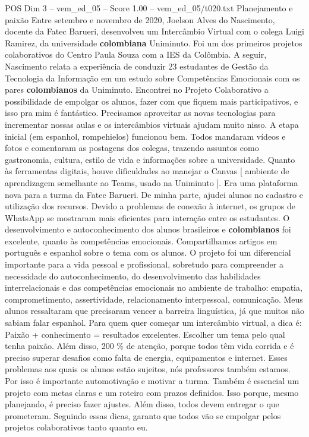 \begin{textsample}{POS Dim 3 – vem\_ed\_05 – Score 1.00 – vem\_ed\_05/t020.txt}  \label{ex:f3_pos_123}
Planejamento e paixão Entre setembro e novembro de 2020, Joelson Alves do Nascimento, docente da Fatec Barueri, desenvolveu um Intercâmbio Virtual com o colega Luigi Ramirez, da universidade \textbf{colombiana} Uniminuto.
Foi um dos primeiros projetos colaborativos do Centro Paula Souza com a IES da Colômbia.
A seguir, Nascimento relata a experiência de conduzir 23 estudantes de Gestão da Tecnologia da Informação em um estudo sobre Competências Emocionais com os pares \textbf{colombianos} da Uniminuto.
Encontrei no Projeto Colaborativo a possibilidade de empolgar os alunos, fazer com que fiquem mais participativos, e isso pra mim é fantástico.
Precisamos aproveitar as novas tecnologias para incrementar nossas aulas e os intercâmbios virtuais ajudam muito nisso.
A etapa inicial (em espanhol, rompehielos) funcionou bem.
Todos mandaram vídeos e fotos e comentaram as postagens dos colegas, trazendo assuntos como gastronomia, cultura, estilo de vida e informações sobre a universidade.
Quanto às ferramentas digitais, houve dificuldades ao manejar o Canvas [ ambiente de aprendizagem semelhante ao Teams, usado na Uniminuto ].
Era uma plataforma nova para a turma da Fatec Barueri.
De minha parte, ajudei alunos no cadastro e utilização dos recursos.
Devido a problemas de conexão à internet, os grupos de WhatsApp se mostraram mais eficientes para interação entre os estudantes.
O desenvolvimento e autoconhecimento dos alunos brasileiros e \textbf{colombianos} foi excelente, quanto às competências emocionais.
Compartilhamos artigos em português e espanhol sobre o tema com os alunos.
O projeto foi um diferencial importante para a vida pessoal e profissional, sobretudo para compreender a necessidade do autoconhecimento, do desenvolvimento das habilidades interrelacionais e das competências emocionais no ambiente de trabalho: empatia, comprometimento, assertividade, relacionamento interpessoal, comunicação.
Meus alunos ressaltaram que precisaram vencer a barreira linguística, já que muitos não sabiam falar espanhol.
Para quem quer começar um intercâmbio virtual, a dica é: Paixão + conhecimento = resultados excelentes.
Escolher um tema pelo qual tenha paixão.
Além disso, 200 \% de atenção, porque todos têm vida corrida e é preciso superar desafios como falta de energia, equipamentos e internet.
Esses problemas aos quais os alunos estão sujeitos, nós professores também estamos.
Por isso é importante automotivação e motivar a turma.
Também é essencial um projeto com metas claras e um roteiro com prazos definidos.
Isso porque, mesmo planejando, é preciso fazer ajustes.
Além disso, todos devem entregar o que prometeram.
Seguindo essas dicas, garanto que todos vão se empolgar pelos projetos colaborativos tanto quanto eu.

\end{textsample}
